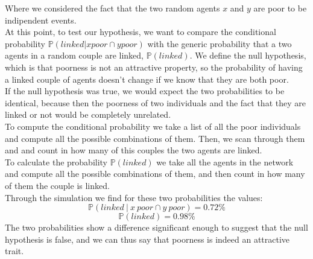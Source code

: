Where we considered the fact that the two random agents $x$ and $y$ are poor to be indipendent events. \\
At this point, to test our hypothesis, we want to compare the conditional probability $\mathbb{P}(linked \vert x poor \cap y poor)$ with the generic probability that a two agents in a random couple are linked, $\mathbb{P}(linked)$. We define the null hypothesis, which is that poorness is not an attractive property, so the probability of having a linked couple of agents doesn't change if we know that they are both poor. \\
If the null hypothesis was true, we would expect the two probabilities to be identical, because then the poorness of two individuals and the fact that they are linked or not would be completely unrelated. \\
To compute the conditional probability we take a list of all the poor individuals and compute all the possible combinations of them. Then, we scan through them and and count in how many of this couples the two agents are linked. \\
To calculate the probability $\mathbb{P}(linked)$ we take all the agents in the network and compute all the possible combinations of them, and then count in how many of them the couple is linked. \\
Through the simulation we find for these two probabilities the values:
\begin{equation*}
	\mathbb{P}(linked \ \vert \ x \ poor \cap y \ poor) = 0.72\%
\end{equation*}
\begin{equation*}
	\mathbb{P}(linked) = 0.98\%
\end{equation*}
The two probabilities show a difference significant enough to suggest that the null hypothesis is false, and we can thus say that poorness is indeed an attractive trait.
